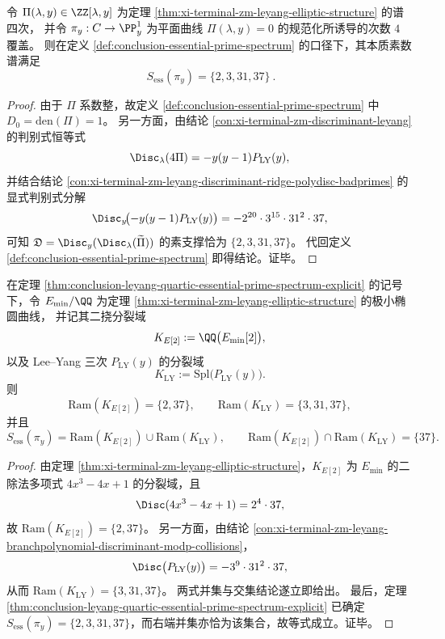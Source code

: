 \begin{theorem}\label{thm:conclusion-leyang-quartic-essential-prime-spectrum-explicit}
令 \(\Pi(\lambda,y)\in\ZZ[\lambda,y]\) 为定理 \ref{thm:xi-terminal-zm-leyang-elliptic-structure} 的谱四次，
并令 \(\pi_y:C\to\PP^1_y\) 为平面曲线 \(\Pi(\lambda,y)=0\) 的规范化所诱导的次数 \(4\) 覆盖。
则在定义 \ref{def:conclusion-essential-prime-spectrum} 的口径下，其本质素数谱满足
\[
\boxed{\ S_{\mathrm{ess}}(\pi_y)=\{2,3,31,37\}\ }.
\]
\end{theorem}
\begin{proof}
由于 \(\Pi\) 系数整，故定义 \ref{def:conclusion-essential-prime-spectrum} 中 \(D_0=\mathrm{den}(\Pi)=1\)。
另一方面，由结论 \ref{con:xi-terminal-zm-discriminant-leyang} 的判别式恒等式
\[
\Disc_{\lambda}(4\Pi)=-y(y-1)P_{\mathrm{LY}}(y),
\]
并结合结论 \ref{con:xi-terminal-zm-leyang-discriminant-ridge-polydisc-badprimes} 的显式判别式分解
\[
\Disc_y\!\bigl(-y(y-1)P_{\mathrm{LY}}(y)\bigr)=-2^{20}\cdot 3^{15}\cdot 31^{2}\cdot 37,
\]
可知 \(\mathfrak D=\Disc_y(\Disc_\lambda(\widetilde\Pi))\) 的素支撑恰为 \(\{2,3,31,37\}\)。
代回定义 \ref{def:conclusion-essential-prime-spectrum} 即得结论。证毕。
\end{proof}

\begin{theorem}\label{thm:conclusion-leyang-37-coupling-decomposition}
在定理 \ref{thm:conclusion-leyang-quartic-essential-prime-spectrum-explicit} 的记号下，令 \(E_{\min}/\QQ\) 为定理 \ref{thm:xi-terminal-zm-leyang-elliptic-structure} 的极小椭圆曲线，
并记其二挠分裂域
\[
K_{E[2]}:=\QQ\bigl(E_{\min}[2]\bigr),
\]
以及 Lee--Yang 三次 \(P_{\mathrm{LY}}(y)\) 的分裂域
\[
K_{\mathrm{LY}}:=\mathrm{Spl}\bigl(P_{\mathrm{LY}}(y)\bigr).
\]
则
\[
\mathrm{Ram}(K_{E[2]})=\{2,37\},\qquad
\mathrm{Ram}(K_{\mathrm{LY}})=\{3,31,37\},
\]
并且
\[
S_{\mathrm{ess}}(\pi_y)=\mathrm{Ram}(K_{E[2]})\cup \mathrm{Ram}(K_{\mathrm{LY}}),
\qquad
\mathrm{Ram}(K_{E[2]})\cap \mathrm{Ram}(K_{\mathrm{LY}})=\{37\}.
\]
\end{theorem}
\begin{proof}
由定理 \ref{thm:xi-terminal-zm-leyang-elliptic-structure}，\(K_{E[2]}\) 为 \(E_{\min}\) 的二除法多项式 \(4x^3-4x+1\) 的分裂域，且
\[
\Disc(4x^3-4x+1)=2^4\cdot 37,
\]
故 \(\mathrm{Ram}(K_{E[2]})=\{2,37\}\)。
另一方面，由结论 \ref{con:xi-terminal-zm-leyang-branchpolynomial-discriminant-modp-collisions}，
\[
\Disc\bigl(P_{\mathrm{LY}}(y)\bigr)=-3^9\cdot 31^2\cdot 37,
\]
从而 \(\mathrm{Ram}(K_{\mathrm{LY}})=\{3,31,37\}\)。
两式并集与交集结论遂立即给出。
最后，定理 \ref{thm:conclusion-leyang-quartic-essential-prime-spectrum-explicit} 已确定 \(S_{\mathrm{ess}}(\pi_y)=\{2,3,31,37\}\)，而右端并集亦恰为该集合，故等式成立。证毕。
\end{proof}

